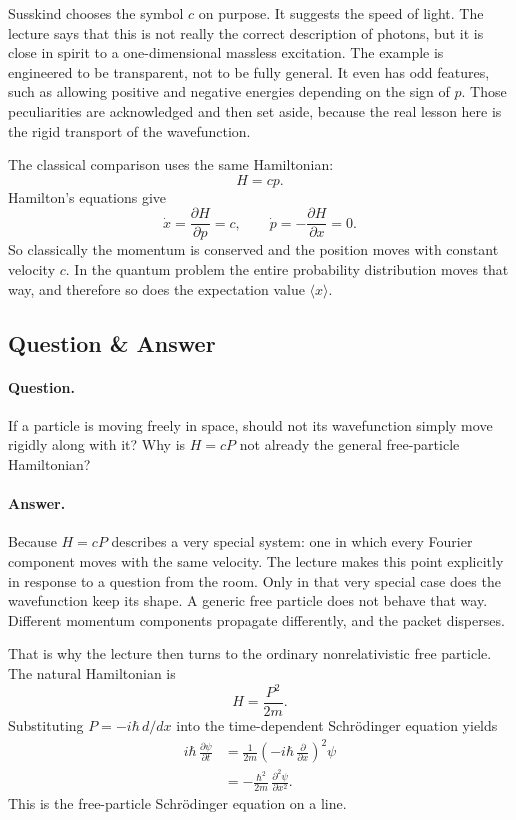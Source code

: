 Susskind chooses the symbol $c$ on purpose. It suggests the speed of light. The lecture says that this is not really the correct description of photons, but it is close in spirit to a one-dimensional massless excitation. The example is engineered to be transparent, not to be fully general. It even has odd features, such as allowing positive and negative energies depending on the sign of $p$. Those peculiarities are acknowledged and then set aside, because the real lesson here is the rigid transport of the wavefunction.

The classical comparison uses the same Hamiltonian:
\begin{equation}
H=cp.
\end{equation}
Hamilton's equations give
\begin{equation}
\dot{x}=\frac{\partial H}{\partial p}=c,
\qquad
\dot{p}=-\frac{\partial H}{\partial x}=0.
\end{equation}
So classically the momentum is conserved and the position moves with constant velocity $c$. In the quantum problem the entire probability distribution moves that way, and therefore so does the expectation value $\langle x\rangle$.

\subsection{Question \& Answer}

\paragraph{Question.} If a particle is moving freely in space, should not its wavefunction simply move rigidly along with it? Why is $H=cP$ not already the general free-particle Hamiltonian?

\paragraph{Answer.} Because $H=cP$ describes a very special system: one in which every Fourier component moves with the same velocity. The lecture makes this point explicitly in response to a question from the room. Only in that very special case does the wavefunction keep its shape. A generic free particle does not behave that way. Different momentum components propagate differently, and the packet disperses.

That is why the lecture then turns to the ordinary nonrelativistic free particle. The natural Hamiltonian is
\begin{equation}
H=\frac{P^2}{2m}.
\end{equation}
Substituting $P=-i\hbar\,d/dx$ into the time-dependent Schr\"odinger equation yields
\begin{align}
i\hbar\,\frac{\partial \psi}{\partial t}
&=\frac{1}{2m}\left(-i\hbar\,\frac{\partial}{\partial x}\right)^2\psi \\
&=-\frac{\hbar^2}{2m}\,\frac{\partial^2\psi}{\partial x^2}.
\end{align}
This is the free-particle Schr\"odinger equation on a line.

